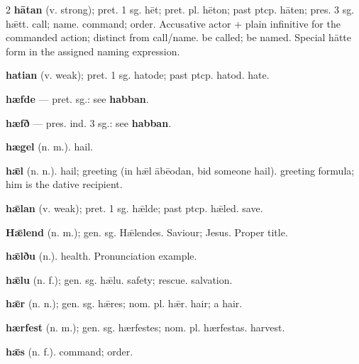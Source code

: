 \begin{multicols*}{2}
\textbf{hātan} (v. strong); pret. 1 sg. hēt; pret. pl. hēton; past ptcp. hāten; pres. 3 sg. hǣtt. call; name. command; order. Accusative actor + plain infinitive for the commanded action; distinct from call/name. be called; be named. Special hātte form in the assigned naming expression.\par
\textbf{hatian} (v. weak); pret. 1 sg. hatode; past ptcp. hatod. hate.\par
\textbf{hæfde} — pret. sg.: see \textbf{habban}.\par
\textbf{hæfð} — pres. ind. 3 sg.: see \textbf{habban}.\par
\textbf{hægel} (n. m.). hail.\par
\textbf{hǣl} (n. n.). hail; greeting (in hǣl ābēodan, bid someone hail). greeting formula; him is the dative recipient.\par
\textbf{hǣlan} (v. weak); pret. 1 sg. hǣlde; past ptcp. hǣled. save.\par
\textbf{Hǣlend} (n. m.); gen. sg. Hǣlendes. Saviour; Jesus. Proper title.\par
\textbf{hǣlðu} (n.). health. Pronunciation example.\par
\textbf{hǣlu} (n. f.); gen. sg. hǣlu. safety; rescue. salvation.\par
\textbf{hǣr} (n. n.); gen. sg. hǣres; nom. pl. hǣr. hair; a hair.\par
\textbf{hærfest} (n. m.); gen. sg. hærfestes; nom. pl. hærfestas. harvest.\par
\textbf{hǣs} (n. f.). command; order.\par

\end{multicols*}
